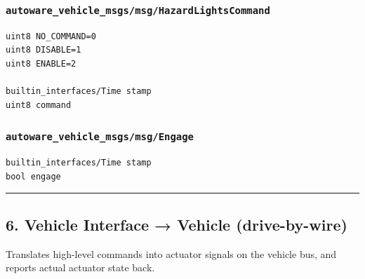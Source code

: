 \documentclass[
]{article}
\begin{document}
\subsubsection{\texorpdfstring{\texttt{autoware\_vehicle\_msgs/msg/HazardLightsCommand}}{autoware\_vehicle\_msgs/msg/HazardLightsCommand}}\label{autoware_vehicle_msgsmsghazardlightscommand}

\begin{verbatim}
uint8 NO_COMMAND=0
uint8 DISABLE=1
uint8 ENABLE=2

builtin_interfaces/Time stamp
uint8 command
\end{verbatim}

\subsubsection{\texorpdfstring{\texttt{autoware\_vehicle\_msgs/msg/Engage}}{autoware\_vehicle\_msgs/msg/Engage}}\label{autoware_vehicle_msgsmsgengage}

\begin{verbatim}
builtin_interfaces/Time stamp
bool engage
\end{verbatim}

\begin{center}\rule{0.5\linewidth}{0.5pt}\end{center}

\subsection{6. Vehicle Interface → Vehicle
(drive-by-wire)}\label{6-vehicle-interface--vehicle-drive-by-wire}

Translates high-level commands into actuator signals on the vehicle bus,
and reports actual actuator state back.
\end{document}
